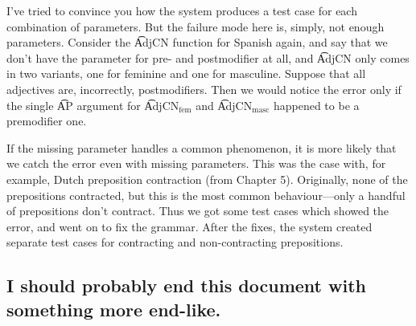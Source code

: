 I've tried to convince you how the system produces a test case for
each combination of parameters. But the failure mode here is, simply,
not enough parameters.  Consider the \t{AdjCN} function for Spanish
again, and say that we don’t have the parameter for pre- and
postmodifier at all, and \t{AdjCN} only comes in two variants, one for
feminine and one for masculine. Suppose that all adjectives are,
incorrectly, postmodifiers. Then we would notice the error only if the
single \t{AP} argument for \t{AdjCN$_{\text{fem}}$} and
\t{AdjCN$_{\text{masc}}$} happened to be a premodifier one.

If the missing parameter handles a common phenomenon, it is more
likely that we catch the error even with missing parameters. This was
the case with, for example, Dutch preposition contraction (from
Chapter 5). Originally, none of the prepositions contracted, but this
is the most common behaviour—only a handful of prepositions don’t
contract. Thus we got some test cases which showed the error, and went
on to fix the grammar. After the fixes, the system created separate
test cases for contracting and non-contracting prepositions.

\subsection{I should probably end this document with something more end-like.}
